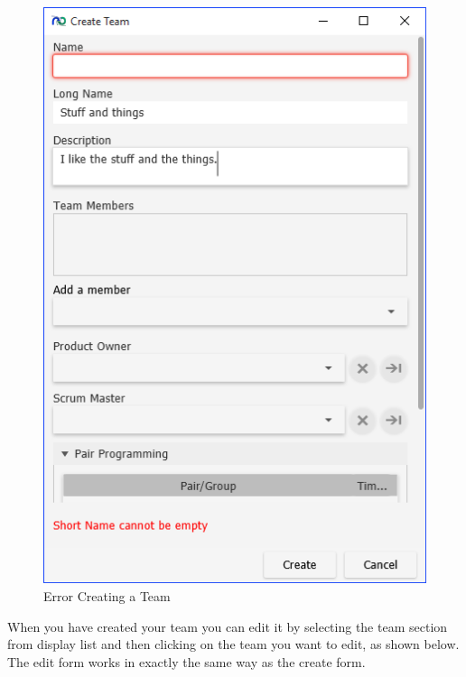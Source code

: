 \begin{figure}[H]
\centering
\includegraphics[width=\textwidth]{images/screenshots/teams3.PNG}
\caption{Error Creating a Team}
\label{fig:new_project}
\end{figure}

When you have created your team you can edit it by selecting the team section from display list and then clicking on the team you want to edit, as shown below. The edit form works in exactly the same way as the create form.

